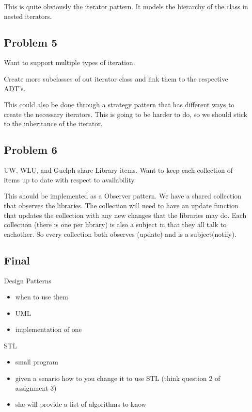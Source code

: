 \documentclass[12pt]{article}
\begin{document}
This is quite obviously the iterator pattern. It models the hierarchy of the class in nested iterators.

\subsection*{Problem 5}
Want to support multiple types of iteration.

Create more subclasses of out iterator class and link them to the respective ADT's.

This could also be done through a strategy pattern that has different ways to create the necessary iterators. This is going to be harder to do, so we should stick to the inheritance of the iterator.

\subsection*{Problem 6}
UW, WLU, and Guelph share Library items. Want to keep each collection of items up to date with respect to availability.

This should be implemented as a Observer pattern. We have a shared collection that observes the libraries. The collection will need to have an update function that updates the collection with any new changes that the libraries may do. Each collection (there is one per library) is also a subject in that they all talk to eachother. So every collection both observes (update) and is a subject(notify).


\subsection*{Final}
Design Patterns
\begin{itemize}
  \item when to use them
  \item UML
  \item implementation of one
\end{itemize}
STL
\begin{itemize}
  \item small program
  \item given a senario how to you change it to use STL (think question 2 of assignment 3)
  \item she will provide a list of algorithms to know
\end{itemize}
\end{document}

